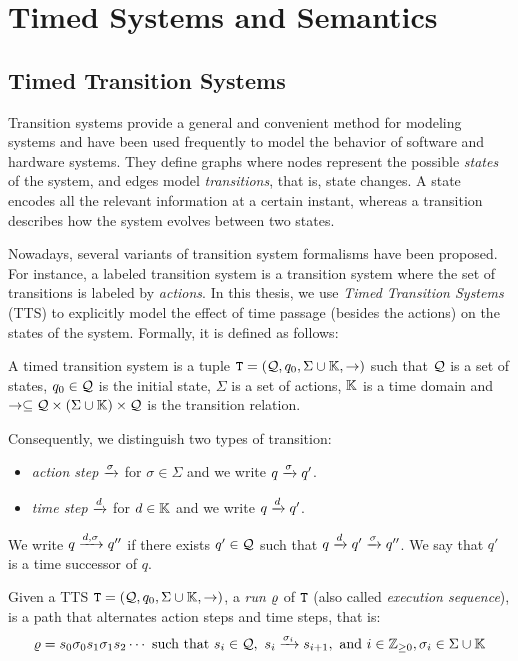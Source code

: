 \chapter{Timed Systems and Semantics}\label{chap:2} 
\minitoc
\section{Timed Transition Systems}
Transition systems provide a general and convenient method for modeling 
systems and have been used frequently to model the behavior of 
software and hardware systems. They define graphs where nodes
represent the possible \emph{states} of the system, and edges model 
\emph{transitions}, that is, state changes. A state encodes all the relevant 
information at a certain instant, whereas a transition describes how the system
evolves between two states. 

Nowadays, several variants of transition system formalisms have been 
proposed. For instance, a labeled transition system is a transition system
where the set of transitions is labeled by \emph{actions}.
In this thesis, we use \emph{Timed Transition Systems} (TTS)
to explicitly model the effect of time passage (besides the actions)
on the states of the system. Formally, it is defined as follows:  

\begin{definition}\label{def:tts}
  A timed transition system is a tuple $\texttt{T}=(\mathcal{Q},q_0,\Sigma\cup\mathbb{K},\to)$ such that $\mathcal{Q}$ is 
  a set of states, $q_0\in\mathcal{Q}$ is the initial state, $\Sigma$ is a set of
  actions, $\mathbb{K}$ is a time domain and $\to\subseteq\mathcal{Q}\times
  (\Sigma\cup\mathbb{K})\times\mathcal{Q}$ is the transition relation.
\end{definition}
Consequently, we distinguish two types of transition:
\begin{itemize}
  \item \emph{action step} $\xrightarrow{\sigma}$ for $\sigma\in\Sigma$ and we write 
    $q\xrightarrow{\sigma}q'$. 
  \item \emph{time step} $\xrightarrow{d}$ for $d\in\mathbb{K}$ and we write $q\xrightarrow{d}q'$. 
\end{itemize}
We write $q\xrightarrow{d,\sigma}q''$ if there exists $q'\in\mathcal{Q}$
such that $q\xrightarrow{d}q'\xrightarrow{\sigma}q''$. We say that $q'$ is
a time successor of $q$.

Given a TTS $\texttt{T}=(\mathcal{Q},q_0,\Sigma\cup\mathbb{K},\to)$, a \emph{run} $\varrho$ of $\texttt{T}$ (also called 
\emph{execution sequence}), is a path that alternates action steps and 
time steps, that is:
\begin{displaymath}
  \varrho=s_0\sigma_0 s_1\sigma_1 s_2\cdots \text{ such that } 
  s_i\in\mathcal{Q}, \  s_i\xrightarrow{\sigma_{i}}s_{i+1},\text{ and } 
  i\in\mathbb{Z}_{\ge 0},\sigma_i\in\Sigma\cup\mathbb{K}
\end{displaymath}

